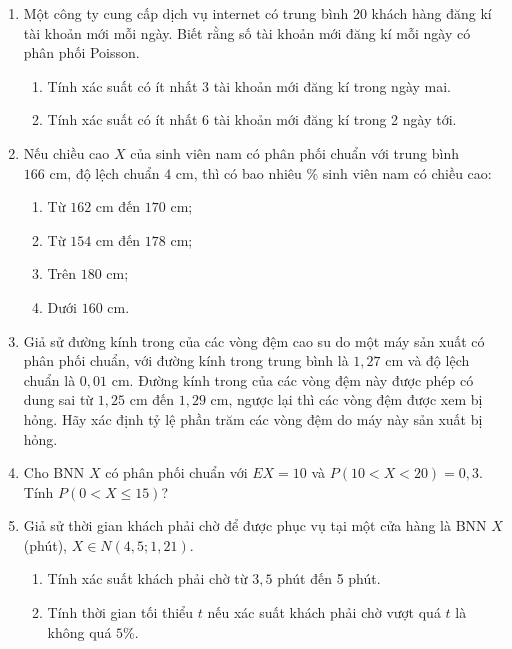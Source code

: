 \documentclass[12pt,a4paper]{article}
\theoremstyle{definition}
\begin{document}
\begin{enumerate}[label=\textbf{\arabic*.}]
    \item Một công ty cung cấp dịch vụ internet có trung bình 20 khách hàng đăng kí tài khoản mới mỗi ngày. Biết rằng số tài khoản mới đăng kí mỗi ngày có phân phối Poisson.
    \begin{enumerate}[label=\alph*)]
        \item Tính xác suất có ít nhất 3 tài khoản mới đăng kí trong ngày mai.
        \item Tính xác suất có ít nhất 6 tài khoản mới đăng kí trong 2 ngày tới.
    \end{enumerate}

    \item Nếu chiều cao $X$ của sinh viên nam có phân phối chuẩn với trung bình $166\text{ cm}$, độ lệch chuẩn $4\text{ cm}$, thì có bao nhiêu $\%$ sinh viên nam có chiều cao:
    \begin{enumerate}[label=(\arabic*)]
        \item Từ $162\text{ cm}$ đến $170\text{ cm}$;
        \item Từ $154\text{ cm}$ đến $178\text{ cm}$;
        \item Trên $180\text{ cm}$;
        \item Dưới $160\text{ cm}$.
    \end{enumerate}

    \item Giả sử đường kính trong của các vòng đệm cao su do một máy sản xuất có phân phối chuẩn, với đường kính trong trung bình là $1{,}27\text{ cm}$ và độ lệch chuẩn là $0{,}01\text{ cm}$. Đường kính trong của các vòng đệm này được phép có dung sai từ $1{,}25\text{ cm}$ đến $1{,}29\text{ cm}$, ngược lại thì các vòng đệm được xem bị hỏng. Hãy xác định tỷ lệ phần trăm các vòng đệm do máy này sản xuất bị hỏng.

    \item Cho BNN $X$ có phân phối chuẩn với $EX = 10$ và $P(10 < X < 20) = 0{,}3$. Tính $P(0 < X \le 15)$?

    \item Giả sử thời gian khách phải chờ để được phục vụ tại một cửa hàng là BNN $X$ (phút), $X \in N(4{,}5; 1{,}21)$.
    \begin{enumerate}[label=\arabic*)]
        \item Tính xác suất khách phải chờ từ $3{,}5$ phút đến 5 phút.
        \item Tính thời gian tối thiểu $t$ nếu xác suất khách phải chờ vượt quá $t$ là không quá $5\%$.
    \end{enumerate}


\end{enumerate}
\end{document}
